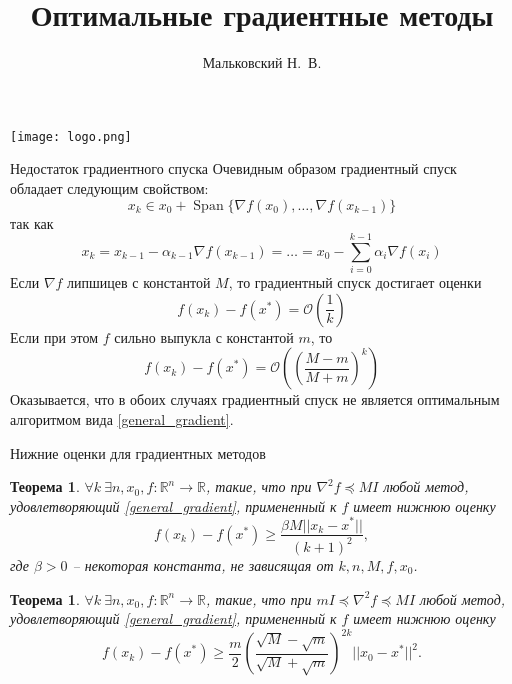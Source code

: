 \documentclass[10pt, handout]{beamer}
\author{Мальковский Н.~В.}
\title[Оптимальные методы]{Оптимальные градиентные методы}
\institute[СПбАУ]{Санкт-Петербургский академический университет}
\date{}
\DeclareMathOperator{\lin}{Span}
\newcounter{thm}
\newtheorem{theorem_ru}[thm]{Теорема}
\begin{document}
\begin{frame}
\titlepage
\centering
\texttt{[image: logo.png]}
\end{frame}

\begin{frame}{Недостаток градиентного спуска}
Очевидным образом градиентный спуск обладает следующим свойством:
\begin{equation}\label{general_gradient}
x_k\in x_0+\lin\{\nabla f(x_0), \ldots, \nabla f(x_{k-1})\}
\end{equation}
так как
$$
x_k=x_{k-1}-\alpha_{k-1}\nabla f(x_{k-1})=\ldots = x_0-\sum_{i=0}^{k-1}\alpha_i\nabla f(x_i)
$$
\pause
Если $\nabla f$ липшицев с константой $M$, то градиентный спуск достигает оценки
$$
f(x_k)-f(x^*)=\mathcal{O}\left(\frac{1}{k}\right)
$$
\pause
Если при этом $f$ сильно выпукла с константой $m$, то
$$
f(x_k)-f(x^*)=\mathcal{O}\left(\left(\frac{M-m}{M+m}\right)^k\right)
$$
\pause
Оказывается, что в обоих случаях градиентный спуск не является оптимальным алгоритмом вида \eqref{general_gradient}.
\end{frame}

\begin{frame}{Нижние оценки для градиентных методов}
\begin{theorem_ru}\label{lower_bound}
$\forall k~\exists n, x_0, f:\mathbb{R}^n\rightarrow\mathbb{R}$, такие, что при $\nabla^2f\preceq MI$ любой метод, удовлетворяющий \eqref{general_gradient}, примененный к $f$ имеет нижнюю оценку
$$
f(x_k)-f(x^*)\geq \frac{\beta M||x_k-x^*||}{(k+1)^2},
$$ 
где $\beta>0$ -- некоторая константа, не зависящая от $k, n, M, f, x_0$.
\end{theorem_ru}
\pause
\begin{theorem_ru}\label{lower_bound_strong}
$\forall k~\exists n, x_0, f:\mathbb{R}^n\rightarrow\mathbb{R}$, такие, что при $mI\preceq\nabla^2f\preceq MI$ любой метод, удовлетворяющий \eqref{general_gradient}, примененный к $f$ имеет нижнюю оценку
$$
f(x_k)-f(x^*)\geq \frac{m}{2} \left(\frac{\sqrt{M}-\sqrt{m}}{\sqrt{M}+\sqrt{m}}\right)^{2k}||x_0-x^*||^2.
$$ 
\end{theorem_ru}

\end{frame}
\end{document}
